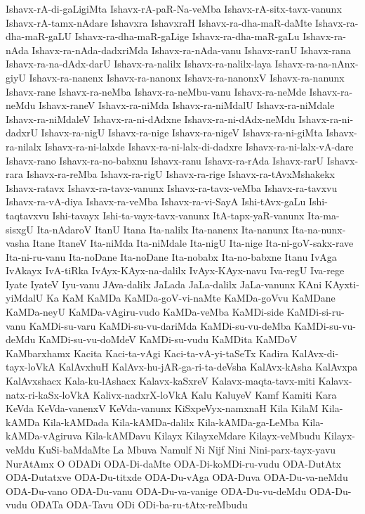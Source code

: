 {Ishavx-rA-di-gaLigiMta
Ishavx-rA-paR-Na-veMba
Ishavx-rA-sitx-tavx-vanunx
Ishavx-rA-tamx-nAdare
Ishavxra
IshavxraH
Ishavx-ra-dha-maR-daMte
Ishavx-ra-dha-maR-gaLU
Ishavx-ra-dha-maR-gaLige
Ishavx-ra-dha-maR-gaLu
Ishavx-ra-nAda
Ishavx-ra-nAda-dadxriMda
Ishavx-ra-nAda-vanu
Ishavx-ranU
Ishavx-rana
Ishavx-ra-na-dAdx-darU
Ishavx-ra-nalilx
Ishavx-ra-nalilx-laya
Ishavx-ra-na-nAnx-giyU
Ishavx-ra-nanenx
Ishavx-ra-nanonx
Ishavx-ra-nanonxV
Ishavx-ra-nanunx
Ishavx-rane
Ishavx-ra-neMba
Ishavx-ra-neMbu-vanu
Ishavx-ra-neMde
Ishavx-ra-neMdu
Ishavx-raneV
Ishavx-ra-niMda
Ishavx-ra-niMdalU
Ishavx-ra-niMdale
Ishavx-ra-niMdaleV
Ishavx-ra-ni-dAdxne
Ishavx-ra-ni-dAdx-neMdu
Ishavx-ra-ni-dadxrU
Ishavx-ra-nigU
Ishavx-ra-nige
Ishavx-ra-nigeV
Ishavx-ra-ni-giMta
Ishavx-ra-nilalx
Ishavx-ra-ni-lalxde
Ishavx-ra-ni-lalx-di-dadxre
Ishavx-ra-ni-lalx-vA-dare
Ishavx-rano
Ishavx-ra-no-babxnu
Ishavx-ranu
Ishavx-ra-rAda
Ishavx-rarU
Ishavx-rara
Ishavx-ra-reMba
Ishavx-ra-rigU
Ishavx-ra-rige
Ishavx-ra-tAvxMshakekx
Ishavx-ratavx
Ishavx-ra-tavx-vanunx
Ishavx-ra-tavx-veMba
Ishavx-ra-tavxvu
Ishavx-ra-vA-diya
Ishavx-ra-veMba
Ishavx-ra-vi-SayA
Ishi-tAvx-gaLu
Ishi-taqtavxvu
Ishi-tavayx
Ishi-ta-vayx-tavx-vanunx
ItA-tapx-yaR-vanunx
Ita-ma-sisxgU
Ita-nAdaroV
ItanU
Itana
Ita-nalilx
Ita-nanenx
Ita-nanunx
Ita-na-nunx-vasha
Itane
ItaneV
Ita-niMda
Ita-niMdale
Ita-nigU
Ita-nige
Ita-ni-goV-sakx-rave
Ita-ni-ru-vanu
Ita-noDane
Ita-noDane
Ita-nobabx
Ita-no-babxne
Itanu
IvAga
IvAkayx
IvA-tiRka
IvAyx-KAyx-na-dalilx
IvAyx-KAyx-navu
Iva-regU
Iva-rege
Iyate
IyateV
Iyu-vanu
JAva-dalilx
JaLada
JaLa-dalilx
JaLa-vanunx
KAni
KAyxti-yiMdalU
Ka
KaM
KaMDa
KaMDa-goV-vi-naMte
KaMDa-goVvu
KaMDane
KaMDa-neyU
KaMDa-vAgiru-vudo
KaMDa-veMba
KaMDi-side
KaMDi-si-ru-vanu
KaMDi-su-varu
KaMDi-su-vu-dariMda
KaMDi-su-vu-deMba
KaMDi-su-vu-deMdu
KaMDi-su-vu-doMdeV
KaMDi-su-vudu
KaMDita
KaMDoV
KaMbarxhamx
Kacita
Kaci-ta-vAgi
Kaci-ta-vA-yi-taSeTx
Kadira
KalAvx-di-tayx-loVkA
KalAvxhuH
KalAvx-hu-jAR-ga-ri-ta-deVsha
KalAvx-kAsha
KalAvxpa
KalAvxshacx
Kala-ku-lAshacx
Kalavx-kaSxreV
Kalavx-maqta-tavx-miti
Kalavx-natx-ri-kaSx-loVkA
Kalivx-nadxrX-loVkA
Kalu
KaluyeV
Kamf
Kamiti
Kara
KeVda
KeVda-vanenxV
KeVda-vanunx
KiSxpeVyx-namxnaH
Kila
KilaM
Kila-kAMDa
Kila-kAMDada
Kila-kAMDa-dalilx
Kila-kAMDa-ga-LeMba
Kila-kAMDa-vAgiruva
Kila-kAMDavu
Kilayx
KilayxeMdare
Kilayx-veMbudu
Kilayx-veMdu
KuSi-baMdaMte
La
Mbuva
Namulf
Ni
Nijf
Nini
Nini-parx-tayx-yavu
NurAtAmx
O
ODADi
ODA-Di-daMte
ODA-Di-koMDi-ru-vudu
ODA-DutAtx
ODA-Dutatxve
ODA-Du-titxde
ODA-Du-vAga
ODA-Duva
ODA-Du-va-neMdu
ODA-Du-vano
ODA-Du-vanu
ODA-Du-va-vanige
ODA-Du-vu-deMdu
ODA-Du-vudu
ODATa
ODA-Tavu
ODi
ODi-ba-ru-tAtx-reMbudu
}
